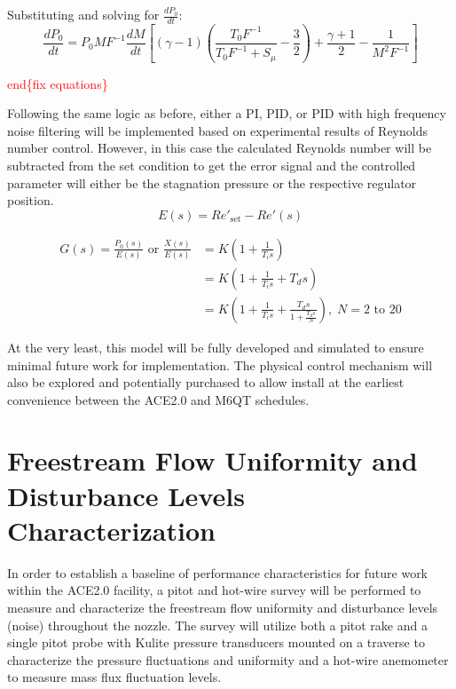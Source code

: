 \noindent Substituting and solving for $\frac{dP_0}{dt}$:
\begin{equation}
    \frac{dP_0}{dt} = P_0 M F^{-1} \frac{dM}{dt} \left[ (\gamma-1) \left( \frac{T_0 F^{-1}}{T_0 F^{-1} + S_\mu} - \frac{3}{2} \right) + \frac{\gamma+1}{2} - \frac{1}{M^2 F^{-1}} \right]
\end{equation}

\textcolor{red}{end\{fix equations\}}

Following the same logic as before, either a PI, PID, or PID with high frequency noise filtering will be implemented based on experimental results of Reynolds number control. However, in this case the calculated Reynolds number will be subtracted from the set condition to get the error signal and the controlled parameter will either be the stagnation pressure or the respective regulator position.
\begin{equation}
    E(s) = Re'_{\mathrm{set}} - Re'(s)
\end{equation}

\vspace{-1.5cm}
\begin{subequations}
    \begin{align}
        G(s) = \frac{P_0(s)}{E(s)} \textrm{ or } \frac{X(s)}{E(s)} &= K \left(1 + \frac{1}{T_i s}\right) \label{eq:Re-PI}\\
                                 &= K \left(1 + \frac{1}{T_i s} + T_d s\right) \label{eq:Re-PID}\\
                                 &= K \left(1 + \frac{1}{T_i s} + \frac{T_d s}{1+\frac{T_d s}{N}}\right), \; N=2\textrm{ to }20 \label{eq:Re-PID-filter}
    \end{align}
\end{subequations}

At the very least, this model will be fully developed and simulated to ensure minimal future work for implementation. The physical control mechanism will also be explored and potentially purchased to allow install at the earliest convenience between the ACE2.0 and M6QT schedules.

\section{Freestream Flow Uniformity and Disturbance Levels Characterization}

In order to establish a baseline of performance characteristics for future work within the ACE2.0 facility, a pitot and hot-wire survey will be performed to measure and characterize the freestream flow uniformity and disturbance levels (noise) throughout the nozzle. The survey will utilize both a pitot rake and a single pitot probe with Kulite pressure transducers mounted on a traverse to characterize the pressure fluctuations and uniformity and a hot-wire anemometer to measure mass flux fluctuation levels.

